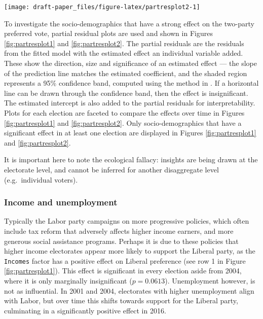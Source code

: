 \documentclass[11pt,a4paper,]{article}
\let\origfigure\figure
\let\endorigfigure\endfigure
\renewenvironment{figure}[1][2] {
    \expandafter\origfigure\expandafter[htbp]
} {
    \endorigfigure
}
\begin{document}
\begin{figure}[h]

{\centering \texttt{[image: draft-paper\_files/figure-latex/partresplot2-1]} 

}

\caption{Partial residual plots by election year for a selection of predictors. Linear model with 95\% confidence bands overlaid. Several predictors have a negative relationship: with larger values indicating the electorate more likely preferences Labor. Most relationships are relatively stable over elections, except OtherLanguage and Education.}\label{fig:partresplot2}
\end{figure}

To investigate the socio-demographics that have a strong effect on the
two-party preferred vote, partial residual plots are used and shown in
Figures \ref{fig:partresplot1} and \ref{fig:partresplot2}. The partial
residuals are the residuals from the fitted model with the estimated
effect an individual variable added. These show the direction, size and
significance of an estimated effect --- the slope of the prediction line
matches the estimated coefficient, and the shaded region represents a
95\% confidence band, computed using the method in \textcite{visreg}. If
a horizontal line can be drawn through the confidence band, then the
effect is insignificant. The estimated intercept is also added to the
partial residuals for interpretability. Plots for each election are
faceted to compare the effects over time in Figures
\ref{fig:partresplot1} and \ref{fig:partresplot2}. Only
socio-demographics that have a significant effect in at least one
election are displayed in Figures \ref{fig:partresplot1} and
\ref{fig:partresplot2}.

It is important here to note the ecological fallacy: insights are being
drawn at the electorate level, and cannot be inferred for another
disaggregate level (e.g.~individual voters).

\subsubsection{Income and unemployment}\label{income-and-unemployment}

Typically the Labor party campaigns on more progressive policies, which
often include tax reform that adversely affects higher income earners,
and more generous social assistance programs. Perhaps it is due to these
policies that higher income electorates appear more likely to support
the Liberal party, as the \texttt{Incomes} factor has a positive effect
on Liberal preference (see row 1 in Figure \ref{fig:partresplot1}). This
effect is significant in every election aside from 2004, where it is
only marginally insignificant (\(p = 0.0613\)). Unemployment however, is
not as influential. In 2001 and 2004, electorates with higher
unemployment align with Labor, but over time this shifts towards support
for the Liberal party, culminating in a significantly positive effect in
2016.
\end{document}
